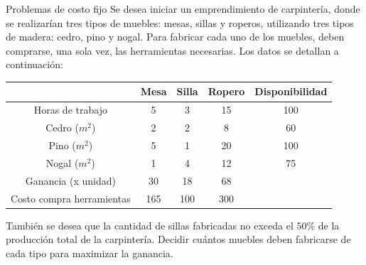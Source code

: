 \documentclass[10pt, aspectratio=169]{beamer}
\begin{document}
\begin{frame}{Problemas de costo fijo}
    \small
    Se desea iniciar un emprendimiento de carpintería, donde se realizarían tres tipos de muebles: mesas, sillas y
    roperos, utilizando tres tipos de madera: cedro, pino y nogal. Para
    fabricar cada uno de los muebles, deben comprarse, una sola vez, las herramientas necesarias. Los datos se detallan
    a continuación:
    \begin{table}[]
        \centering
        \begin{tabular}{ccccc} \toprule
             & Mesa & Silla & Ropero & Disponibilidad  \\ \midrule
            Horas de trabajo & 5 & 3 & 15 & 100 \\ \hline
            Cedro ($m^2$) & 2 & 2 & 8 & 60 \\ \hline 
            Pino ($m^2$) & 5 & 1 & 20 & 100 \\ \hline 
            Nogal ($m^2$) & 1 & 4 & 12 & 75 \\ \hline
            Ganancia (x unidad) & 30 & 18 & 68 & \\ \hline
            Costo compra herramientas & 165 & 100 & 300 & \\ \hline
        \end{tabular}
    \end{table}
    También se desea que la cantidad de sillas fabricadas no exceda el $50\%$
    de la producción total de la carpintería. Decidir cuántos
    muebles deben fabricarse de cada tipo para maximizar la ganancia.
\end{frame}
\end{document}
